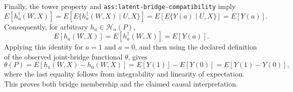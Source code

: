 Finally, the tower property and
\texttt{ass:latent-bridge-compatibility} imply
\[
E[h_a^\dagger(W,X)]
=E\!\left[E\{h_a^\dagger(W,X)\mid U,X\}\right]
=E\!\left[E\{Y(a)\mid U,X\}\right]
=E[Y(a)].
\]
Consequently, for arbitrary \(h_a\in\mathcal H_a(P)\),
\[
E[h_a(W,X)]=E[h_a^\dagger(W,X)]=E[Y(a)].
\]
Applying this identity for \(a=1\) and \(a=0\), and then using the declared
definition of the observed joint-bridge functional \(\theta\), gives
\[
\theta(P)
=E[h_1(W,X)-h_0(W,X)]
=E[Y(1)]-E[Y(0)]
=E[Y(1)-Y(0)],
\]
where the last equality follows from integrability and linearity of
expectation.  This proves both bridge membership and the claimed causal
interpretation.

